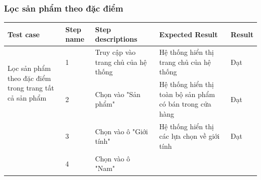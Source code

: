 \subsubsection{Lọc sản phẩm theo đặc điểm}
{
    \setlength\extrarowheight{6pt}
    \begin{longtable}{| p{2.5cm}| p{1cm}| p{5.5cm}| p{4.5cm} | p{1.5cm} |}
        \hline
        \textbf{Test case}                                                             & \textbf{Step name} & \textbf{Step descriptions} & \textbf{Expected Result} & \textbf{Result} \\
        \hline
        \multirow[t]{2}{2.5cm}{Lọc sản phẩm theo đặc điểm trong trang tất cả sản phẩm} &
        1                                                                              &
        Truy cập vào trang chủ của hệ thống                                            &
        Hệ thống hiển thị trang chủ của hệ thống                                       &
        Đạt                                                                                                                                                                           \\
        \cline{2-5}
                                                                                       & 2                  &
        Chọn vào "Sản phẩm"                                                            &
        Hệ thống hiển thị toàn bộ sản phẩm có bán trong cửa hàng                       &
        Đạt                                                                                                                                                                           \\
        \cline{2-5}
                                                                                       & 3                  &
        Chọn vào ô "Giới tính"                                                         &
        Hệ thống hiển thị các lựa chọn về giới tính                                    &
        Đạt                                                                                                                                                                           \\
        \cline{2-5}
                                                                                       & 4                  &
        Chọn vào ô "Nam"                                                               &

\end{longtable}}
